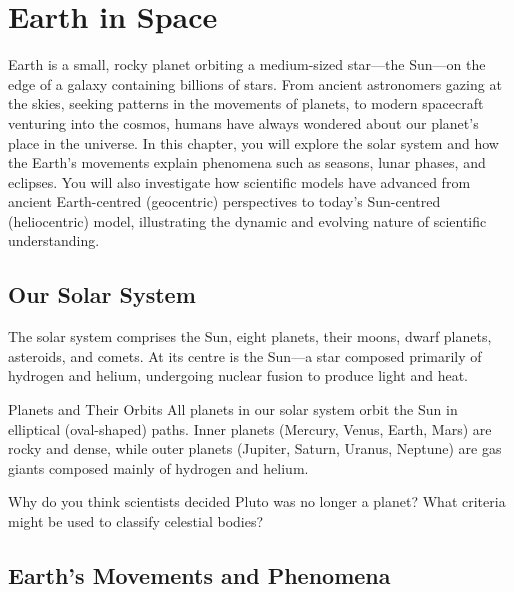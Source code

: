 \chapter{Earth in Space}

Earth is a small, rocky planet orbiting a medium-sized star—the Sun—on the edge of a galaxy containing billions of stars. From ancient astronomers gazing at the skies, seeking patterns in the movements of planets, to modern spacecraft venturing into the cosmos, humans have always wondered about our planet's place in the universe. In this chapter, you will explore the solar system and how the Earth's movements explain phenomena such as seasons, lunar phases, and eclipses. You will also investigate how scientific models have advanced from ancient Earth-centred (geocentric) perspectives to today's Sun-centred (heliocentric) model, illustrating the dynamic and evolving nature of scientific understanding.

\section{Our Solar System}

The solar system comprises the Sun, eight planets, their moons, dwarf planets, asteroids, and comets. At its centre is the Sun—a star composed primarily of hydrogen and helium, undergoing nuclear fusion to produce light and heat.


\begin{keyconcept}{Planets and Their Orbits}
All planets in our solar system orbit the Sun in elliptical (oval-shaped) paths. Inner planets (Mercury, Venus, Earth, Mars) are rocky and dense, while outer planets (Jupiter, Saturn, Uranus, Neptune) are gas giants composed mainly of hydrogen and helium.
\end{keyconcept}


\begin{stopandthink}
Why do you think scientists decided Pluto was no longer a planet? What criteria might be used to classify celestial bodies?
\end{stopandthink}

\section{Earth's Movements and Phenomena}

